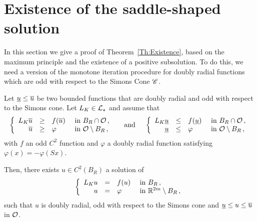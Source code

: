 \section{Existence of the saddle-shaped solution}
\label{Sec:Existence}


In this section we give a proof of Theorem~\ref{Th:Existence}, based on the maximum principle and the existence of a positive subsolution. To do this, we need a version of the monotone iteration procedure for doubly radial functions which are odd with respect to the Simons Cone $\mathscr{C}$.

\begin{proposition}
	\label{Prop:MonotoneIterationOdd}
	Let $\underline{u} \leq \overline{u}$ be two bounded functions that are doubly radial and odd with respect to the Simons cone. Let $L_K\in \mathcal{L}_\star$  and assume that
	$$
	\left\{\begin{array}{rcll}
	L_K\overline{u} & \geq & f(\overline{u}) & \textrm{ in } B_R \cap \mathcal{O}\,, \\
	\overline{u} & \geq & \varphi & \textrm{ in } \mathcal{O} \setminus B_R\,, 
	\end{array} \right.
	\quad \textrm{ and } \quad 
	\left\{\begin{array}{rcll}
	L_K\underline{u} & \leq & f(\underline{u}) & \textrm{ in } B_R \cap \mathcal{O}\,, \\
	\underline{u} & \leq & \varphi & \textrm{ in } \mathcal{O} \setminus B_R\,, 
	\end{array} \right.
	$$
	with $f$ an odd $C^2$ function and $\varphi$ a doubly radial function satisfying $\varphi (x) = - \varphi(Sx)$.
	
	Then, there exists $u\in C^2(B_R)$ a solution of
	$$
	\left\{\begin{array}{rcll}
	L_K u & = & f(u) & \textrm{ in } B_R\,, \\
	u &=& \varphi &  \textrm{ in } \mathbb{R}^{2m} \setminus B_R\,, 
	\end{array} \right.
	$$
	such that $u$ is doubly radial, odd with respect to the Simons cone and  $\underline{u} \leq u \leq \overline{u}$ in $\mathcal{O}$.
\end{proposition}

